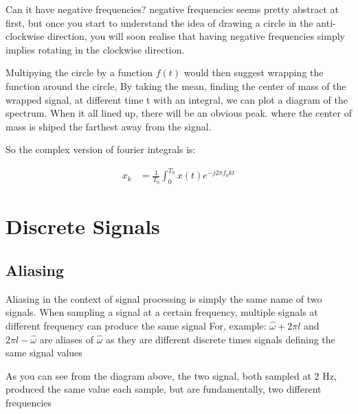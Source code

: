 \documentclass{article}
\newlength\tindent
\renewcommand{\indent}{\hspace*{\tindent}}
\begin{document}
    Can it have negative frequencies? negative frequencies seems pretty abstract at first, 
    but once you start to understand the idea of drawing a circle in the anti-clockwise direction,
    you will soon realise that having negative frequencies simply implies rotating in the clockwise direction.\\\indent

    Multipying the circle by a function $f(t)$ would then suggest wrapping the function around the circle,
    By taking the mean, finding the center of mass of the wrapped signal, at different time t with an integral, we can plot a diagram of the spectrum.
    When it all lined up, there will be an obvious peak. where the center of mass is shiped the farthest away from the signal.\\\indent

    So the complex version of fourier integrals is:

    \begin{align}
        x_k &= \frac{1}{T_0} \int_{0}^{T_0} x(t) e^{-j 2 \pi f_0 kt}
    \end{align}

\section{Discrete Signals}
    \subsection{Aliasing}
    Aliasing in the context of signal processing is simply the same name of two signals. 
    When sampling a signal at a certain frequency, multiple signals at different frequency can produce the same signal
    For, example: $\hat{\omega} + 2\pi l$ and $2\pi l - \hat{\omega}$ are aliases of $\hat{\omega}$
    as they are different discrete times signals defining the same signal values
    \begin{center}
    \end{center}
    As you can see from the diagram above, the two signal, both sampled at 2 Hz, 
    produced the same value each sample, but are fundamentally, two different frequencies\\\indent
\end{document}
